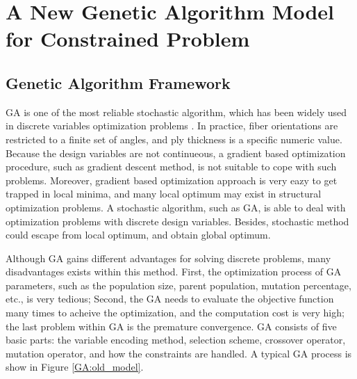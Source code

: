 
\chapter{A New Genetic Algorithm Model for Constrained Problem} %

\label{Chapter2} %


\section{Genetic Algorithm Framework}
GA is one of the most reliable stochastic algorithm, which has been widely used
in discrete variables optimization problems  \cite { schmit1973optimum,
	schmit1977optimum, fukunaga1991strength, soares1995discrete, le1995improved,
	jayatheertha1996application, wang1996optimum, adali1997minimum,
	correia1997higher, scares1997optimization, abu1998optimum, lombardi1998anti,
le1998design, sivakumar1998optimum, barakat1999use, richard2000reliability,
moita2000sensitivity, soremekun2001composite, walker2003technique,
di2003multiconstrained, kere2003using}. In practice, fiber orientations are
restricted to a finite set of angles, and ply thickness is a specific numeric
value. Because the design variables are not continueous, a gradient based
optimization procedure, such as gradient descent method, is not suitable to cope
with such problems. Moreover, gradient based optimization approach is very eazy
to get trapped in local minima, and many local optimum may exist in structural
optimization problems. A stochastic algorithm, such as GA, is able to deal with
optimization problems with discrete design variables. Besides, stochastic method
could escape from local optimum, and obtain global optimum. 

Although GA gains different advantages for solving discrete problems, many
disadvantages exists within this method. First, the optimization process of GA
parameters, such as the population size, parent population, mutation percentage,
etc., is very tedious; Second, the GA needs to evaluate the objective function
many times to acheive the optimization, and the computation cost is very high;
the last problem within GA is the premature convergence. GA consists of five
basic parts: the variable encoding method, selection scheme, crossover operator,
mutation operator, and how the constraints are handled. A typical GA process is
show in Figure \ref{GA:old_model}.

